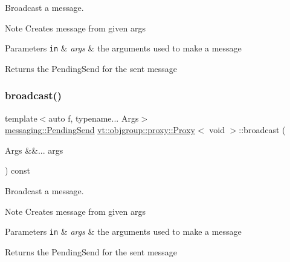Broadcast a message. 

\begin{DoxyNote}{Note}
Creates message from given args
\end{DoxyNote}

\begin{DoxyParams}[1]{Parameters}
\mbox{\tt in}  & {\em args} & the arguments used to make a message\\
\hline
\end{DoxyParams}
\begin{DoxyReturn}{Returns}
the {\ttfamily Pending\+Send} for the sent message 
\end{DoxyReturn}
\mbox{\label{structvt_1_1objgroup_1_1proxy_1_1_proxy_3_01void_01_4_aef5ca6344823e49472221126a074ca90}} 
\subsubsection{\texorpdfstring{broadcast()}{broadcast()}\hspace{0.1cm}{\footnotesize\ttfamily [2/2]}}
{\footnotesize\ttfamily template$<$auto f, typename... Args$>$ \\
\hyperlink{structvt_1_1messaging_1_1_pending_send}{messaging\+::\+Pending\+Send} \hyperlink{structvt_1_1objgroup_1_1proxy_1_1_proxy}{vt\+::objgroup\+::proxy\+::\+Proxy}$<$ void $>$\+::broadcast (\begin{DoxyParamCaption}\item[{Args \&\&...}]{args }\end{DoxyParamCaption}) const\hspace{0.3cm}{\ttfamily [inline]}}



Broadcast a message. 

\begin{DoxyNote}{Note}
Creates message from given args
\end{DoxyNote}

\begin{DoxyParams}[1]{Parameters}
\mbox{\tt in}  & {\em args} & the arguments used to make a message\\
\hline
\end{DoxyParams}
\begin{DoxyReturn}{Returns}
the {\ttfamily Pending\+Send} for the sent message 
\end{DoxyReturn}
\mbox{\label{structvt_1_1objgroup_1_1proxy_1_1_proxy_3_01void_01_4_ae600f4143bb8102bc15264adc713dfea}} 

